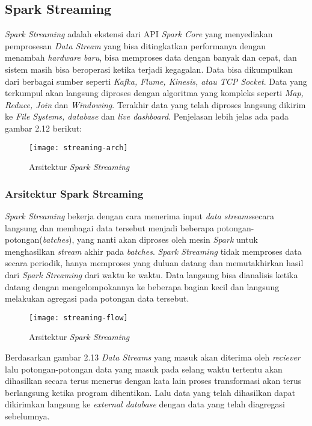 \subsection{Spark Streaming}
\textit{Spark Streaming} adalah ekstensi dari API \textit{Spark Core} yang menyediakan pemprosesan \textit{Data Stream} yang bisa ditingkatkan performanya dengan menambah \textit{hardware baru}, bisa memproses data dengan banyak dan cepat, dan sistem masih bisa beroperasi ketika terjadi kegagalan. Data bisa dikumpulkan dari berbagai sumber seperti \textit{Kafka, Flume, Kinesis, atau TCP Socket}. Data yang terkumpul akan langsung diproses dengan algoritma yang kompleks seperti \textit{Map, Reduce, Join} dan \textit{Windowing}. Terakhir data yang telah diproses langsung dikirim ke \textit{File Systems, database} dan \textit{live dashboard}. Penjelasan lebih jelas ada pada gambar 2.12 berikut:

\begin{figure}[H] 
	\centering  
	\texttt{[image: streaming-arch]}  
	\caption[Gambar Arsitektur {\it Spark Streaming}]{Arsitektur {\it Spark Streaming}} 
	\label{fig:processing-events relationship} 
	\end{figure}

\subsubsection{Arsitektur Spark Streaming}
\textit{Spark Streaming} bekerja dengan cara menerima input \textit{data streams}secara langsung dan membagai data tersebut menjadi beberapa potongan-potongan(\textit{batches}), yang nanti akan diproses oleh mesin \textit{Spark} untuk menghasilkan \textit{stream} akhir pada \textit{batches}. \textit{Spark Streaming} tidak memproses data secara periodik, hanya memproses yang duluan datang dan memutakhirkan hasil dari \textit{Spark Streaming} dari waktu ke waktu. Data langsung bisa dianalisis ketika datang dengan mengelompokannya ke beberapa bagian kecil dan langsung melakukan agregasi pada potongan data tersebut.

\begin{figure}[H] 
	\centering  
	\texttt{[image: streaming-flow]}  
	\caption[Gambar Arsitektur {\it Spark Streaming}]{Arsitektur {\it Spark Streaming}} 
	\label{fig:processing-events relationship} 
	\end{figure}
	
	
Berdasarkan gambar 2.13 \textit{Data Streams} yang masuk akan diterima oleh \textit{reciever} lalu potongan-potongan data yang masuk pada selang waktu tertentu akan dihasilkan secara terus menerus dengan kata lain proses transformasi akan terus berlangsung ketika program dihentikan.
Lalu data yang telah dihasilkan dapat dikirimkan langsung ke \textit{external database} dengan data yang telah diagregasi sebelumnya.

